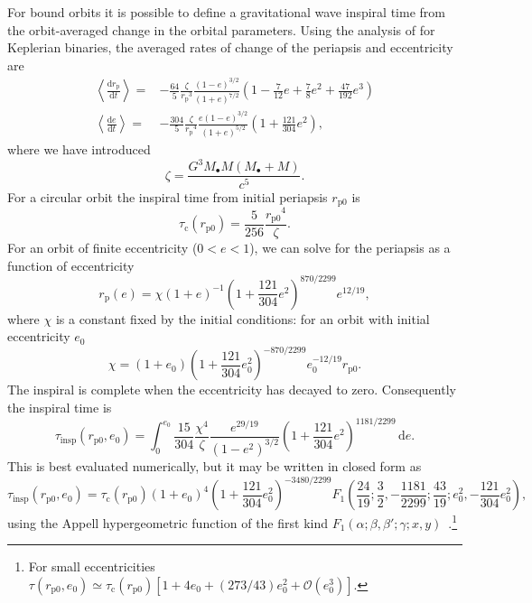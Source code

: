 \documentclass[useAMS,usedcolumn,usegraphicx,usenatbib]{mn2e}
\newcommand{\sub}[1]{\ensuremath{_\mathrm{#1}}}
\newcommand{\dd}{\ensuremath{\mathrm{d}}}
\newcommand{\diff}[2]{\ensuremath{\frac{\dd {#1}}{\dd {#2}}}}
\newcommand{\intd}[4]{\ensuremath{\displaystyle \int_{#1}^{#2}{#3}\,\dd{#4}}}
\newcommand{\order}[1]{\ensuremath{\mathcal{O}({#1})}}
\begin{document}
\begin{onecolumn}
For bound orbits it is possible to define a gravitational wave inspiral time from the orbit-averaged change in the orbital parameters. Using the analysis of \citet{Peters1964} for Keplerian binaries, the averaged rates of change of the periapsis and eccentricity are
\begin{align}
\left\langle\diff{r\sub{p}}{t}\right\rangle = {} & -\frac{64}{5}\frac{\zeta}{r\sub{p}^3}\frac{(1 - e)^{3/2}}{(1 + e)^{7/2}}\left(1 - \frac{7}{12}e + \frac{7}{8}e^2 + \frac{47}{192}e^3\right) \\
\left\langle\diff{e}{t}\right\rangle = {} & -\frac{304}{5}\frac{\zeta}{r\sub{p}^4}\frac{e(1 - e)^{3/2}}{(1 + e)^{5/2}}\left(1 + \frac{121}{304}e^2\right),
\end{align}
where we have introduced
\begin{equation}
\zeta = \frac{G^3M_\bullet M(M_\bullet + M)}{c^5}.
\end{equation}
For a circular orbit the inspiral time from initial periapsis $r\sub{p0}$ is
\begin{equation}
\tau\sub{c}(r\sub{p0}) = \frac{5}{256}\frac{r\sub{p0}^4}{\zeta}.
\end{equation}
For an orbit of finite eccentricity ($0 < e < 1$), we can solve for the periapsis as a function of eccentricity
\begin{equation}
r\sub{p}(e) = \chi(1 + e)^{-1}\left(1 + \frac{121}{304}e^2\right)^{870/2299}e^{12/19},
\end{equation}
where $\chi$ is a constant fixed by the initial conditions: for an orbit with initial eccentricity $e_0$
\begin{equation}
\chi = (1 + e_0)\left(1 + \frac{121}{304}e_0^2\right)^{-870/2299}e_0^{-12/19}r\sub{p0}.
\end{equation}
The inspiral is complete when the eccentricity has decayed to zero. Consequently the inspiral time is~\citep{Peters1964}
\begin{equation}
\tau\sub{insp}(r\sub{p0},e_0) = \intd{0}{e_0}{\frac{15}{304}\frac{\chi^4}{\zeta}\frac{e^{29/19}}{(1-e^2)^{3/2}}\left(1 + \frac{121}{304}e^2\right)^{1181/2299}}{e}.
\end{equation}
This is best evaluated numerically, but it may be written in closed form as
\begin{equation}
\tau\sub{insp}(r\sub{p0},e_0) = \tau\sub{c}(r\sub{p0})(1 + e_0)^4\left(1 + \frac{121}{304}e_0^2\right)^{-3480/2299} F_1\left(\frac{24}{19};\frac{3}{2},-\frac{1181}{2299};\frac{43}{19};e_0^2,-\frac{121}{304}e_0^2\right),
\label{eq:Bound_inspiral}
\end{equation}
using the Appell hypergeometric function of the first kind $F_1(\alpha;\beta,\beta';\gamma;x,y)$~\citep[16.15.1]{Olver2010}.\footnote{For small eccentricities $\tau(r\sub{p0},e_0) \simeq \tau\sub{c}(r\sub{p0})[1 + 4e_0 + (273/43)e_0^2 + \order{e_0^3}]$.}


\end{onecolumn}
\end{document}
